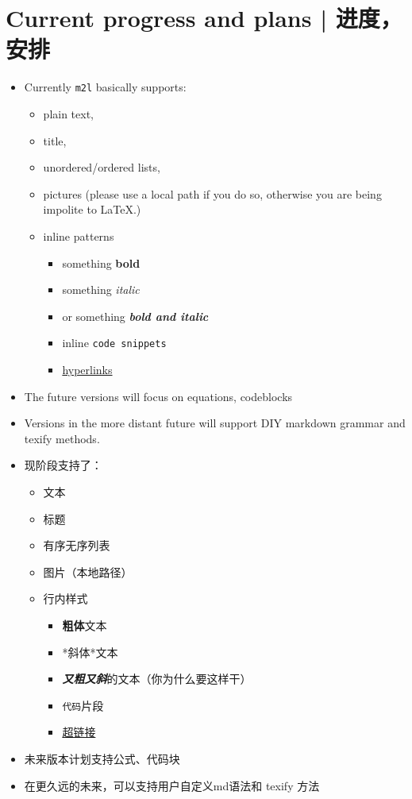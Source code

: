 \documentclass{ctexart}
\begin{document}
	\section{Current progress and plans | 进度，安排}

	\begin{itemize}
		\item Currently \texttt{m2l} basically supports:
		\begin{itemize}
			\item plain text,
			\item title,
			\item unordered/ordered lists,
			\item pictures (please use a local path if you do so, otherwise you are being impolite to LaTeX.)
			\item inline patterns
			\begin{itemize}
				\item something \textbf{bold}
				\item something \textit{italic}
				\item or something \textbf{\textit{bold and italic}}
				\item inline \texttt{code snippets}
				\item \href{https://http.cat/404}{hyperlinks}
			\end{itemize}
		\end{itemize}
		\item The future versions will focus on equations, codeblocks
		\item Versions in the more distant future will support DIY markdown grammar and texify methods.
	\end{itemize}

	\begin{itemize}
		\item 现阶段支持了：
		\begin{itemize}
			\item 文本
			\item 标题
			\item 有序无序列表
			\item 图片（本地路径）
			\item 行内样式
			\begin{itemize}
				\item \textbf{粗体}文本
				\item *斜体*文本
				\item \textbf{\textit{又粗又斜}}的文本（你为什么要这样干）
				\item \texttt{代码}片段
				\item \href{https://http.cat/404}{超链接}
			\end{itemize}
		\end{itemize}
		\item 未来版本计划支持公式、代码块
		\item 在更久远的未来，可以支持用户自定义md语法和 texify 方法
	\end{itemize}
\end{document}
